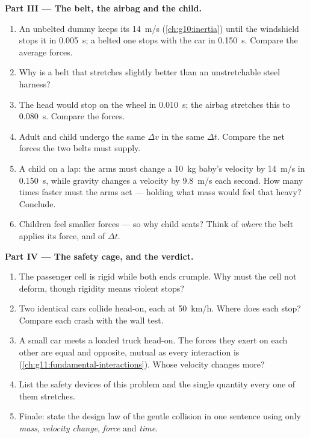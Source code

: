 \begin{problem}
\medskip
\noindent\textbf{Part III --- The belt, the airbag and the child.}
\begin{enumerate}[resume]
  \item An unbelted dummy keeps its \qty{14}{m/s} (\cref{ch:g10:inertia})
        until the windshield stops it in \qty{0.005}{s}; a belted one
        stops with the car in \qty{0.150}{s}. Compare the average forces.
  \item Why is a belt that stretches slightly better than an
        unstretchable steel harness?
  \item The head would stop on the wheel in \qty{0.010}{s}; the airbag
        stretches this to \qty{0.080}{s}. Compare the forces.
  \item Adult and child undergo the same $\Delta v$ in the same
        $\Delta t$. Compare the net forces the two belts must supply.
  \item A child on a lap: the arms must change a \qty{10}{kg} baby's
        velocity by \qty{14}{m/s} in \qty{0.150}{s}, while gravity
        changes a velocity by \qty{9.8}{m/s} each second. How many times
        faster must the arms act --- holding what mass would feel that
        heavy? Conclude.
  \item Children feel smaller forces --- so why child seats? Think of
        \emph{where} the belt applies its force, and of $\Delta t$.
\end{enumerate}

\medskip
\noindent\textbf{Part IV --- The safety cage, and the verdict.}
\begin{enumerate}[resume]
  \item The passenger cell is rigid while both ends crumple. Why must
        the cell not deform, though rigidity means violent stops?
  \item Two identical cars collide head-on, each at \qty{50}{km/h}.
        Where does each stop? Compare each crash with the wall test.
  \item A small car meets a loaded truck head-on. The forces they exert
        on each other are equal and opposite, mutual as every interaction
        is (\cref{ch:g11:fundamental-interactions}). Whose velocity
        changes more?
  \item List the safety devices of this problem and the single quantity
        every one of them stretches.
  \item Finale: state the design law of the gentle collision in one
        sentence using only \emph{mass}, \emph{velocity change},
        \emph{force} and \emph{time}.
\end{enumerate}
\end{problem}
